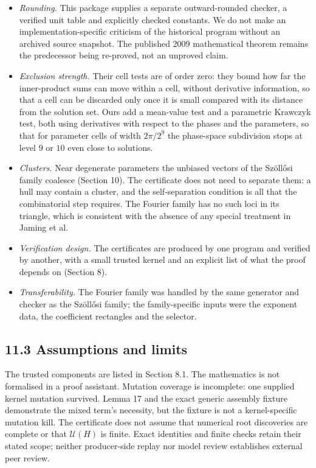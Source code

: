 \documentclass[
  11pt,
]{article}
\providecommand{\tightlist}{%
  \setlength{\itemsep}{0pt}\setlength{\parskip}{0pt}}
\begin{document}
\begin{itemize}
\tightlist
\item
  \emph{Rounding.} This package supplies a separate outward-rounded
  checker, a verified unit table and explicitly checked constants. We do
  not make an implementation-specific criticism of the historical
  program without an archived source snapshot. The published 2009
  mathematical theorem remains the predecessor being re-proved, not an
  unproved claim.
\item
  \emph{Exclusion strength.} Their cell tests are of order zero: they
  bound how far the inner-product sums can move within a cell, without
  derivative information, so that a cell can be discarded only once it
  is small compared with its distance from the solution set. Ours add a
  mean-value test and a parametric Krawczyk test, both using derivatives
  with respect to the phases and the parameters, so that for parameter
  cells of width \(2\pi/2^9\) the phase-space subdivision stops at level
  \(9\) or \(10\) even close to solutions.
\item
  \emph{Clusters.} Near degenerate parameters the unbiased vectors of
  the Szöllősi family coalesce (Section 10). The certificate does not
  need to separate them: a hull may contain a cluster, and the
  self-separation condition is all that the combinatorial step requires.
  The Fourier family has no such loci in its triangle, which is
  consistent with the absence of any special treatment in Jaming et al.
\item
  \emph{Verification design.} The certificates are produced by one
  program and verified by another, with a small trusted kernel and an
  explicit list of what the proof depends on (Section 8).
\item
  \emph{Transferability.} The Fourier family was handled by the same
  generator and checker as the Szöllősi family; the family-specific
  inputs were the exponent data, the coefficient rectangles and the
  selector.
\end{itemize}

\subsection{11.3 Assumptions and limits}\label{assumptions-and-limits}

The trusted components are listed in Section 8.1. The mathematics is not
formalised in a proof assistant. Mutation coverage is incomplete: one
supplied kernel mutation survived. Lemma 17 and the exact generic
assembly fixture demonstrate the mixed term's necessity, but the fixture
is not a kernel-specific mutation kill. The certificate does not assume
that numerical root discoveries are complete or that \(\mathcal U(H)\)
is finite. Exact identities and finite checks retain their stated scope;
neither producer-side replay nor model review establishes external peer
review.
\end{document}
